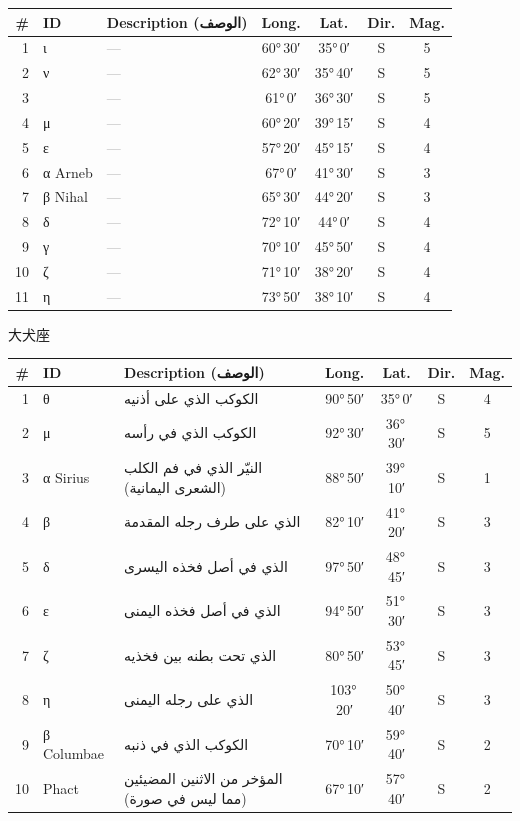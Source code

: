 \documentclass[9pt,a4paper]{extarticle}
\newcommand{\ar}[1]{{\arabicfont\textarabic{#1}}}
\begin{document}
\begin{longtable}{r l >{\raggedright\arraybackslash}p{6.7cm} c c c c}
\toprule \# & ID & Description (\ar{الوصف}) & Long. & Lat. & Dir. & Mag.\\ \midrule\endhead
1 & ι & \textcolor{gray}{—} & 60°\,30′ & 35°\,0′ & S & 5\\
2 & ν & \textcolor{gray}{—} & 62°\,30′ & 35°\,40′ & S & 5\\
3 &  & \textcolor{gray}{—} & 61°\,0′ & 36°\,30′ & S & 5\\
4 & μ & \textcolor{gray}{—} & 60°\,20′ & 39°\,15′ & S & 4\\
5 & ε & \textcolor{gray}{—} & 57°\,20′ & 45°\,15′ & S & 4\\
6 & α Arneb & \textcolor{gray}{—} & 67°\,0′ & 41°\,30′ & S & 3\\
7 & β Nihal & \textcolor{gray}{—} & 65°\,30′ & 44°\,20′ & S & 3\\
8 & δ & \textcolor{gray}{—} & 72°\,10′ & 44°\,0′ & S & 4\\
9 & γ & \textcolor{gray}{—} & 70°\,10′ & 45°\,50′ & S & 4\\
10 & ζ & \textcolor{gray}{—} & 71°\,10′ & 38°\,20′ & S & 4\\
11 & η & \textcolor{gray}{—} & 73°\,50′ & 38°\,10′ & S & 4\\
\bottomrule\end{longtable}
\vspace{4pt}\quad\ar{الكلب الأكبر}\quad 大犬座
\begin{longtable}{r l >{\raggedright\arraybackslash}p{6.7cm} c c c c}
\toprule \# & ID & Description (\ar{الوصف}) & Long. & Lat. & Dir. & Mag.\\ \midrule\endhead
1 & θ & \ar{الكوكب الذي على أذنيه} & 90°\,50′ & 35°\,0′ & S & 4\\
2 & μ & \ar{الكوكب الذي في رأسه} & 92°\,30′ & 36°\,30′ & S & 5\\
3 & α Sirius & \ar{النيّر الذي في فم الكلب (الشعرى اليمانية)} & 88°\,50′ & 39°\,10′ & S & 1\\
4 & β & \ar{الذي على طرف رجله المقدمة} & 82°\,10′ & 41°\,20′ & S & 3\\
5 & δ & \ar{الذي في أصل فخذه اليسرى} & 97°\,50′ & 48°\,45′ & S & 3\\
6 & ε & \ar{الذي في أصل فخذه اليمنى} & 94°\,50′ & 51°\,30′ & S & 3\\
7 & ζ & \ar{الذي تحت بطنه بين فخذيه} & 80°\,50′ & 53°\,45′ & S & 3\\
8 & η & \ar{الذي على رجله اليمنى} & 103°\,20′ & 50°\,40′ & S & 3\\
9 & β Columbae & \ar{الكوكب الذي في ذنبه} & 70°\,10′ & 59°\,40′ & S & 2\\
10 & Phact & \ar{المؤخر من الاثنين المضيئين (مما ليس في صورة)} & 67°\,10′ & 57°\,40′ & S & 2\\
\bottomrule\end{longtable}
\end{document}
